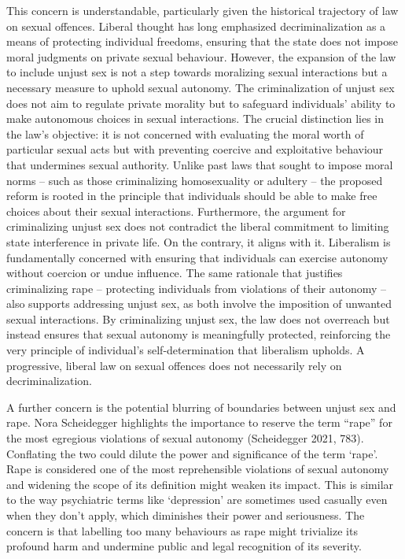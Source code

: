 This concern is understandable, particularly given the historical
trajectory of law on sexual offences. Liberal thought has long
emphasized decriminalization as a means of protecting individual
freedoms, ensuring that the state does not impose moral judgments on
private sexual behaviour. However, the expansion of the law to include
unjust sex is not a step towards moralizing sexual interactions but a
necessary measure to uphold sexual autonomy. The criminalization of
unjust sex does not aim to regulate private morality but to safeguard
individuals' ability to make autonomous choices in sexual interactions.
The crucial distinction lies in the law's objective: it is not concerned
with evaluating the moral worth of particular sexual acts but with
preventing coercive and exploitative behaviour that undermines sexual
authority. Unlike past laws that sought to impose moral norms -- such as
those criminalizing homosexuality or adultery -- the proposed reform is
rooted in the principle that individuals should be able to make free
choices about their sexual interactions. Furthermore, the argument for
criminalizing unjust sex does not contradict the liberal commitment to
limiting state interference in private life. On the contrary, it aligns
with it. Liberalism is fundamentally concerned with ensuring that
individuals can exercise autonomy without coercion or undue influence.
The same rationale that justifies criminalizing rape -- protecting
individuals from violations of their autonomy -- also supports
addressing unjust sex, as both involve the imposition of unwanted sexual
interactions. By criminalizing unjust sex, the law does not overreach
but instead ensures that sexual autonomy is meaningfully protected,
reinforcing the very principle of individual's self-determination that
liberalism upholds. A progressive, liberal law on sexual offences does
not necessarily rely on decriminalization.

A further concern is the potential blurring of boundaries between unjust
sex and rape. Nora Scheidegger highlights the importance to reserve the
term ``rape'' for the most egregious violations of sexual autonomy
(Scheidegger 2021, 783). Conflating the two could dilute the power and
significance of the term `rape'. Rape is considered one of the most
reprehensible violations of sexual autonomy and widening the scope of
its definition might weaken its impact. This is similar to the way
psychiatric terms like `depression' are sometimes used casually even
when they don't apply, which diminishes their power and seriousness. The
concern is that labelling too many behaviours as rape might trivialize
its profound harm and undermine public and legal recognition of its
severity.

